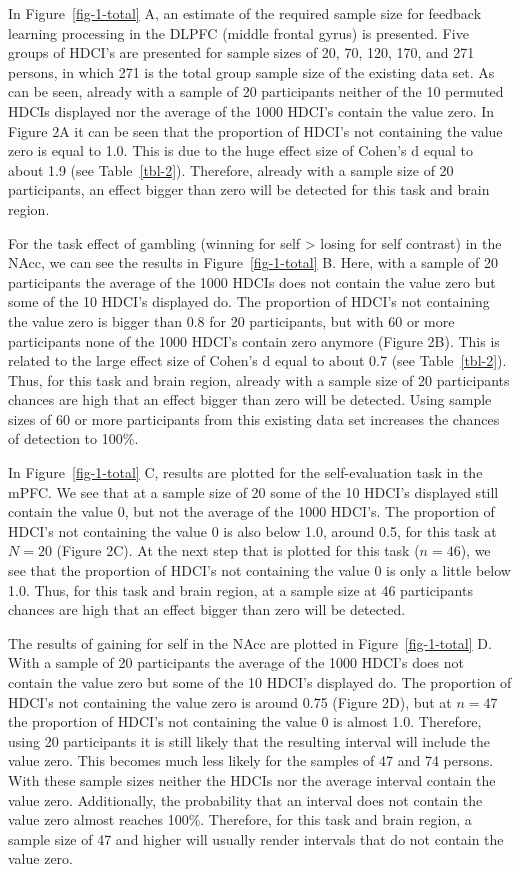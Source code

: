 \documentclass[
  letterpaper,
  DIV=11,
  numbers=noendperiod]{scrartcl}
\begin{document}
In Figure~\ref{fig-1-total} A, an estimate of the required sample size
for feedback learning processing in the DLPFC (middle frontal gyrus) is
presented. Five groups of HDCI's are presented for sample sizes of 20,
70, 120, 170, and 271 persons, in which 271 is the total group sample
size of the existing data set. As can be seen, already with a sample of
20 participants neither of the 10 permuted HDCIs displayed nor the
average of the 1000 HDCI's contain the value zero. In Figure 2A it can
be seen that the proportion of HDCI's not containing the value zero is
equal to 1.0. This is due to the huge effect size of Cohen's d equal to
about 1.9 (see Table~\ref{tbl-2}). Therefore, already with a sample size
of 20 participants, an effect bigger than zero will be detected for this
task and brain region.

For the task effect of gambling (winning for self \textgreater{} losing
for self contrast) in the NAcc, we can see the results in
Figure~\ref{fig-1-total} B. Here, with a sample of 20 participants the
average of the 1000 HDCIs does not contain the value zero but some of
the 10 HDCI's displayed do. The proportion of HDCI's not containing the
value zero is bigger than 0.8 for 20 participants, but with 60 or more
participants none of the 1000 HDCI's contain zero anymore (Figure 2B).
This is related to the large effect size of Cohen's d equal to about 0.7
(see Table~\ref{tbl-2}). Thus, for this task and brain region, already
with a sample size of 20 participants chances are high that an effect
bigger than zero will be detected. Using sample sizes of 60 or more
participants from this existing data set increases the chances of
detection to 100\%.

In Figure~\ref{fig-1-total} C, results are plotted for the
self-evaluation task in the mPFC. We see that at a sample size of 20
some of the 10 HDCI's displayed still contain the value 0, but not the
average of the 1000 HDCI's. The proportion of HDCI's not containing the
value 0 is also below 1.0, around 0.5, for this task at \(N=20\) (Figure
2C). At the next step that is plotted for this task (\(n = 46\)), we see
that the proportion of HDCI's not containing the value 0 is only a
little below 1.0. Thus, for this task and brain region, at a sample size
at 46 participants chances are high that an effect bigger than zero will
be detected.

The results of gaining for self in the NAcc are plotted in
Figure~\ref{fig-1-total} D. With a sample of 20 participants the average
of the 1000 HDCI's does not contain the value zero but some of the 10
HDCI's displayed do. The proportion of HDCI's not containing the value
zero is around 0.75 (Figure 2D), but at \(n = 47\) the proportion of
HDCI's not containing the value 0 is almost 1.0. Therefore, using 20
participants it is still likely that the resulting interval will include
the value zero. This becomes much less likely for the samples of 47 and
74 persons. With these sample sizes neither the HDCIs nor the average
interval contain the value zero. Additionally, the probability that an
interval does not contain the value zero almost reaches 100\%.
Therefore, for this task and brain region, a sample size of 47 and
higher will usually render intervals that do not contain the value zero.
\end{document}
